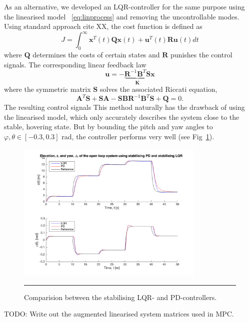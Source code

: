 \documentclass{article}
\begin{document}
As an alternative, we developed an LQR-controller for the same purpose using the linearised model ~\eqref{eq:linprocess} and removing the uncontrollable modes. Using standard approach cite XX, the cost function is defined as
\begin{equation}
J = \int_0^{\infty} \mathbf{x}^T(t)\mathbf{Q}\mathbf{x}(t) + \mathbf{u}^T(t)\mathbf{R}\mathbf{u}(t)dt
\end{equation}
where $\mathbf{Q}$ determines the costs of certain states and $\mathbf{R}$ punishes the control signals. The corresponding linear feedback law
\begin{equation}
\mathbf{u}= -\underbrace{\mathbf{R}^{-1}\mathbf{B}^T\mathbf{S} }_{\mathbf{K}}\mathbf{x}
\end{equation}
where the symmetric matrix $\mathbf{S}$ solves the associated Riccati equation,
\begin{equation}
\mathbf{A}^T\mathbf{S}+\mathbf{S}\mathbf{A}-\mathbf{S}\mathbf{B}\mathbf{R}^{-1}\mathbf{B}^T\mathbf{S}+\mathbf{Q}=0.
\end{equation}
The resulting control signals 
This method naturally has the drawback of using the linearised model, which only accurately describes the system close to the stable, hovering state. But by bounding the pitch and yaw angles to $\varphi,\theta \in [-0.3,0.3]$ rad, the controller performs very well (see Fig~\ref{fig:LQR-PD-comp}).

\begin{figure}[htbp]
\centering
\includegraphics[width=0.8\textwidth]{figures/LQR-PD-comp.png}
\rule{35em}{0.5pt}
\caption{Comparision between the stabilising LQR- and PD-controllers.}
\label{fig:LQR-PD-comp}
\end{figure}

TODO: Write out the augmented linearised system matrices used in MPC.
\end{document}
